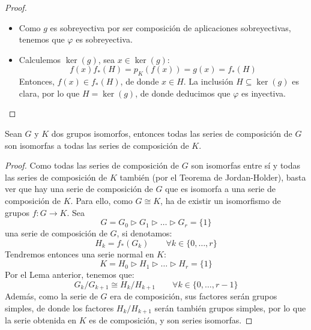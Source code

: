 \begin{lema}
\begin{proof}
        \begin{itemize}
            \item Como $g$ es sobreyectiva por ser composición de aplicaciones sobreyectivas, tenemos que $\varphi$ es sobreyectiva.
            \item Calculemos $\ker(g)$, sea $x\in \ker(g)$:
                \begin{equation*}
                    f(x)f_\ast(H) = p_K(f(x)) = g(x) = f_\ast(H)
                \end{equation*}
                Entonces, $f(x) \in f_\ast(H)$, de donde $x\in H$. La inclusión $H\subseteq \ker(g)$ es clara, por lo que $H = \ker(g)$, de donde deducimos que $\varphi$ es inyectiva.
        \end{itemize}
    \end{proof}
\end{lema}

\begin{prop}
    Sean $G$ y $K$ dos grupos isomorfos, entonces todas las series de composición de $G$ son isomorfas a todas las series de composición de $K$.
    \begin{proof}
        Como todas las series de composición de $G$ son isomorfas entre sí y todas las series de composición de $K$ también (por el Teorema de Jordan-Holder), basta ver que hay una serie de composición de $G$ que es isomorfa a una serie de composición de $K$. Para ello, como $G\cong K$, ha de existir un isomorfismo de grupos $f:G\to K$. Sea
        \begin{equation*}
            G = G_0 \rhd G_1 \rhd \ldots \rhd G_r = \{1\} 
        \end{equation*}
        una serie de composición de $G$, si denotamos:
        \begin{equation*}
            H_k = f_\ast(G_k) \qquad \forall k\in \{0,\ldots,r\}
        \end{equation*}
        Tendremos entonces una serie normal en $K$:
        \begin{equation*}
            K = H_0 \rhd H_1 \rhd \ldots \rhd H_r = \{1\}
        \end{equation*}
        Por el Lema anterior, tenemos que:
        \begin{equation*}
            G_k/G_{k+1} \cong H_k/H_{k+1} \qquad \forall k\in \{0,\ldots,r-1\}
        \end{equation*}
        Además, como la serie de $G$ era de composición, sus factores serán grupos simples, de donde los factores $H_k/H_{k+1}$ serán también grupos simples, por lo que la serie obtenida en $K$ es de composición, y son series isomorfas.
    \end{proof}
\end{prop}~\\

